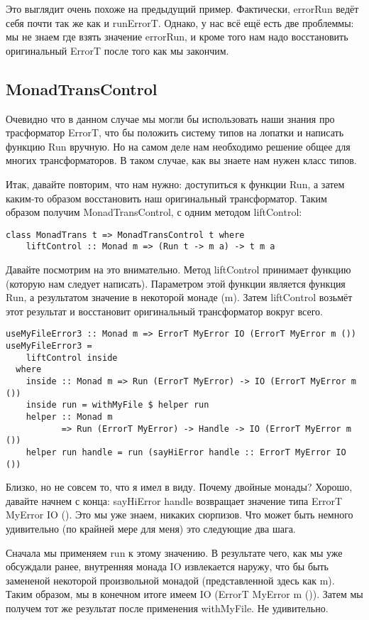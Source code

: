 Это выглядит очень похоже на предыдущий пример. Фактически, errorRun ведёт себя
почти так же как и runErrorT. Однако, у нас всё ещё есть две проблеммы: мы не
знаем где взять значение errorRun, и кроме того нам надо восстановить
оригинальный ErrorT после того как мы закончим.

\subsection{MonadTransControl}
Очевидно что в данном случае мы могли бы использовать наши знания про
трасформатор ErrorT, что бы положить систему типов на лопатки и написать
функцию Run вручную. Но на самом деле нам необходимо решение общее для многих
трансформаторов. В таком случае, как вы знаете нам нужен класс типов.

Итак, давайте повторим, что нам нужно: доступиться к функции Run, а затем
каким-то образом восстановить наш оригинальный трансформатор. Таким образом
получим MonadTransControl, с одним методом liftControl:

\begin{lstlisting}
class MonadTrans t => MonadTransControl t where
    liftControl :: Monad m => (Run t -> m a) -> t m a
\end{lstlisting}

Давайте посмотрим на это внимательно. Метод liftControl принимает функцию
(которую нам следует написать). Параметром этой функции является функция Run, а
результатом значение в некоторой монаде (m). Затем liftControl возьмёт этот
результат и восстановит оригинальный трансформатор вокруг всего.

\begin{lstlisting}
useMyFileError3 :: Monad m => ErrorT MyError IO (ErrorT MyError m ())
useMyFileError3 =
    liftControl inside
  where
    inside :: Monad m => Run (ErrorT MyError) -> IO (ErrorT MyError m ())
    inside run = withMyFile $ helper run
    helper :: Monad m
           => Run (ErrorT MyError) -> Handle -> IO (ErrorT MyError m ())
    helper run handle = run (sayHiError handle :: ErrorT MyError IO ())
\end{lstlisting}

Близко, но не совсем то, что я имел в виду. Почему двойные монады? Хорошо,
давайте начнем с конца: sayHiError handle возвращает значение типа ErrorT
MyError IO (). Это мы уже знаем, никаких сюрпизов. Что может быть немного
удивительно (по крайней мере для меня) это следующие два шага.

Сначала мы применяем run к этому значению. В результате чего, как мы уже
обсуждали ранее, внутренняя монада IO извлекается наружу, что бы быть замененой
некоторой произвольной монадой (представленной здесь как m). Таким образом, мы
в конечном итоге имеем IO (ErrorT MyError m ()). Затем мы получем тот же
результат после применения withMyFile. Не удивительно.

